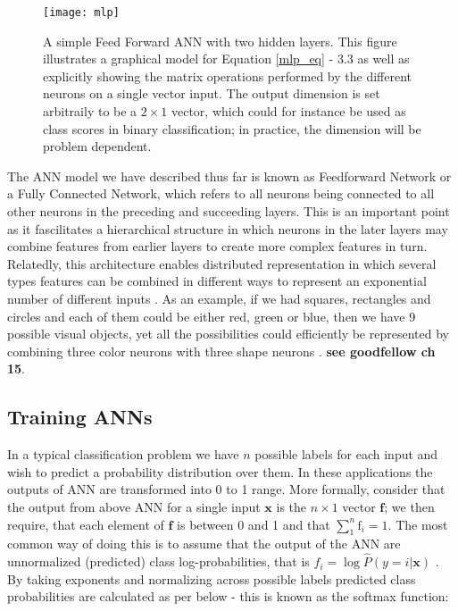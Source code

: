 \documentclass[12pt]{report}
\begin{document}
\begin{figure}[h!]
  \centering
	\texttt{[image: mlp]}
	\caption{A simple Feed Forward ANN with two hidden layers. This figure illustrates a graphical model for Equation \ref{mlp_eq} - 3.3 as well as explicitly showing the matrix operations performed by the different neurons on a single vector input. The output dimension is set arbitraily to be a $2\times1$ vector, which could for instance be used as class scores in binary classification; in practice, the dimension will be problem dependent.}
	\label{fig:mlp}
\end{figure}

The ANN model we have described thus far is known as Feedforward Network or a Fully Connected Network, which refers to all neurons being connected to all other neurons in the preceding and succeeding layers. This is an important point as it fascilitates a hierarchical structure in which neurons in the later layers may combine features from earlier layers to create more complex features in turn. Relatedly, this architecture enables distributed representation in which several types features can be combined in different ways to represent an exponential number of different inputs \cite{Hinton1985}. As an example, if we had squares, rectangles and circles and each of them could be either red, green or blue, then we have 9 possible visual objects, yet all the possibilities could efficiently be represented by combining three color neurons with three shape neurons \cite{Goodfellow2016}. \textbf{see goodfellow ch 15}.

\subsection{Training ANNs}

In a typical classification problem we have $n$ possible labels for each input and wish to predict a probability distribution over them. In these applications the outputs of ANN are transformed into 0 to 1 range. More formally, consider that the output from above ANN for a single input $\mathbf{x}$ is the $n \times 1$ vector $\mathbf{f}$; we then require, that each element of $\mathbf{f}$ is between 0 and 1 and that $\sum_1^n \text{f}_i = 1$. The most common way of doing this is to assume that the output of the ANN are unnormalized (predicted) class log-probabilities, that is $f_i = \log \hat{P}(y = i | \mathbf{x})$ \cite{Goodfellow2016}. By taking exponents and normalizing across possible labels predicted class probabilities are calculated as per below - this is known as the softmax function:
\end{document}
